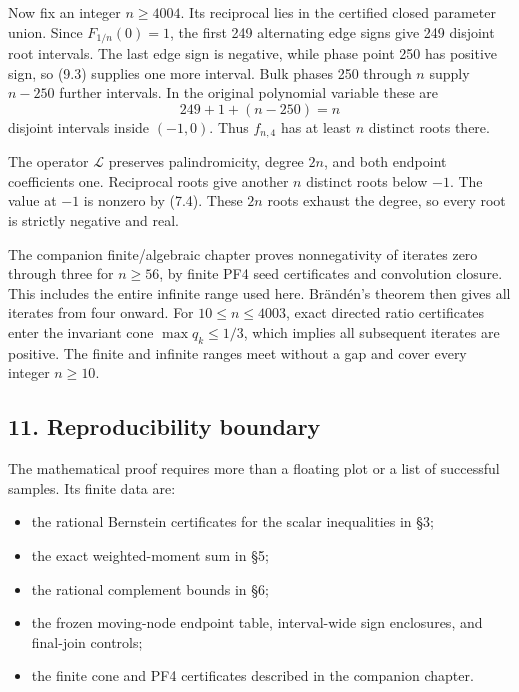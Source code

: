 \documentclass[
  11pt,
]{article}
\providecommand{\tightlist}{%
  \setlength{\itemsep}{0pt}\setlength{\parskip}{0pt}}
\begin{document}
Now fix an integer \(n\ge4004\). Its reciprocal lies in the certified
closed parameter union. Since \(F_{1/n}(0)=1\), the first 249
alternating edge signs give 249 disjoint root intervals. The last edge
sign is negative, while phase point 250 has positive sign, so (9.3)
supplies one more interval. Bulk phases 250 through \(n\) supply
\(n-250\) further intervals. In the original polynomial variable these
are \[
 249+1+(n-250)=n
\] disjoint intervals inside \((-1,0)\). Thus \(f_{n,4}\) has at least
\(n\) distinct roots there.

The operator \(\mathcal L\) preserves palindromicity, degree \(2n\), and
both endpoint coefficients one. Reciprocal roots give another \(n\)
distinct roots below \(-1\). The value at \(-1\) is nonzero by (7.4).
These \(2n\) roots exhaust the degree, so every root is strictly
negative and real.

The companion finite/algebraic chapter proves nonnegativity of iterates
zero through three for \(n\ge56\), by finite PF4 seed certificates and
convolution closure. This includes the entire infinite range used here.
Brändén's theorem then gives all iterates from four onward. For
\(10\le n\le4003\), exact directed ratio certificates enter the
invariant cone \(\max q_k\le1/3\), which implies all subsequent iterates
are positive. The finite and infinite ranges meet without a gap and
cover every integer \(n\ge10\).

\subsection{11. Reproducibility
boundary}\label{reproducibility-boundary}

The mathematical proof requires more than a floating plot or a list of
successful samples. Its finite data are:

\begin{itemize}
\tightlist
\item
  the rational Bernstein certificates for the scalar inequalities in §3;
\item
  the exact weighted-moment sum in §5;
\item
  the rational complement bounds in §6;
\item
  the frozen moving-node endpoint table, interval-wide sign enclosures,
  and final-join controls;
\item
  the finite cone and PF4 certificates described in the companion
  chapter.
\end{itemize}
\end{document}
